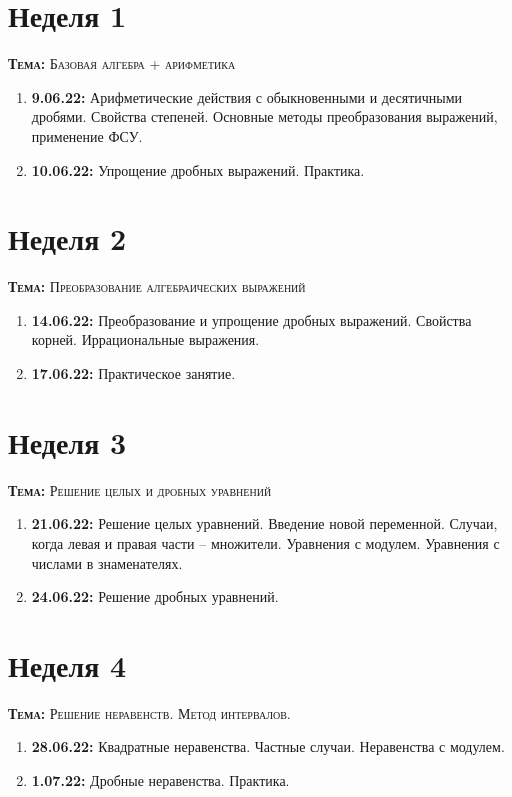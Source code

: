 \documentclass[12pt, a4paper]{article}
\begin{document}
	
 
 \cfoot{}
\renewcommand{\footrulewidth}{1pt}
\section*{Неделя 1}
	\textsc{\textbf{Тема:} Базовая алгебра + арифметика}
	\begin{enumerate}[label=\textbf{\arabic*})]
		\item \textbf{9.06.22:} Арифметические действия с обыкновенными и десятичными дробями. Свойства степеней. Основные методы преобразования выражений, применение ФСУ.
		\item \textbf{10.06.22:} Упрощение дробных выражений. Практика.
	\end{enumerate}
\section*{Неделя 2}
	\textsc{\textbf{Тема:} Преобразование алгебраических выражений}
\begin{enumerate}[label=\textbf{\arabic*})]
	\item \textbf{14.06.22:} Преобразование и упрощение дробных выражений. Свойства корней. Иррациональные выражения.
	\item \textbf{17.06.22:} Практическое занятие.
\end{enumerate}
\section*{Неделя 3}
	\textsc{\textbf{Тема:} Решение целых и дробных уравнений}
\begin{enumerate}[label=\textbf{\arabic*})]
	\item \textbf{21.06.22:} Решение целых уравнений. Введение новой переменной. Случаи, когда левая и правая части -- множители. Уравнения с модулем. Уравнения с числами в знаменателях.
	\item \textbf{24.06.22:} Решение дробных уравнений.
\end{enumerate}
\section*{Неделя 4}
	\textsc{\textbf{Тема:} Решение неравенств. Метод интервалов.}
\begin{enumerate}[label=\textbf{\arabic*})]
	\item \textbf{28.06.22:} Квадратные неравенства. Частные случаи. Неравенства с модулем.
	\item \textbf{1.07.22:} Дробные неравенства. Практика.
\end{enumerate}
\end{document}
